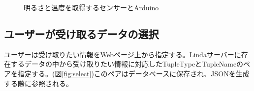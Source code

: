 \begin{figure}[htbp]
  \begin{minipage}{\hsize}
    \begin{center}
    \end{center}
    \caption{明るさと温度を取得するセンサーとArduino}
    \label{fig:arduino_sensor}
  \end{minipage}
\end{figure}

\subsection{ユーザーが受け取るデータの選択}

ユーザーは受け取りたい情報をWebページ上から指定する。Lindaサーバーに存在するデータの中から受け取りたい情報に対応したTupleTypeとTupleNameのペアを指定する。(図\ref{fig:select})このペアはデータベースに保存され、JSONを生成する際に参照される。

